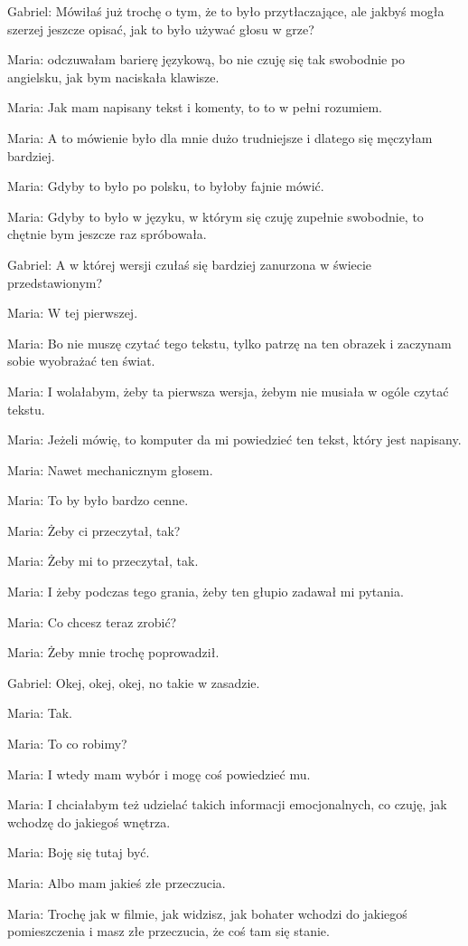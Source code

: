 Gabriel: Mówiłaś już trochę o tym, że to było przytłaczające, ale jakbyś mogła szerzej jeszcze opisać, jak to było używać głosu w grze?

Maria: odczuwałam barierę językową, bo nie czuję się tak swobodnie po angielsku, jak bym naciskała klawisze.

Maria: Jak mam napisany tekst i komenty, to to w pełni rozumiem.

Maria: A to mówienie było dla mnie dużo trudniejsze i dlatego się męczyłam bardziej.

Maria: Gdyby to było po polsku, to byłoby fajnie mówić.

Maria: Gdyby to było w języku, w którym się czuję zupełnie swobodnie, to chętnie bym jeszcze raz spróbowała.

Gabriel: A w której wersji czułaś się bardziej zanurzona w świecie przedstawionym?

Maria: W tej pierwszej.

Maria: Bo nie muszę czytać tego tekstu, tylko patrzę na ten obrazek i zaczynam sobie wyobrażać ten świat.

Maria: I wolałabym, żeby ta pierwsza wersja, żebym nie musiała w ogóle czytać tekstu.

Maria: Jeżeli mówię, to komputer da mi powiedzieć ten tekst, który jest napisany.

Maria: Nawet mechanicznym głosem.

Maria: To by było bardzo cenne.

Maria: Żeby ci przeczytał, tak?

Maria: Żeby mi to przeczytał, tak.

Maria: I żeby podczas tego grania, żeby ten głupio zadawał mi pytania.

Maria: Co chcesz teraz zrobić?

Maria: Żeby mnie trochę poprowadził.

Gabriel: Okej, okej, okej, no takie w zasadzie.

Maria: Tak.

Maria: To co robimy?

Maria: I wtedy mam wybór i mogę coś powiedzieć mu.

Maria: I chciałabym też udzielać takich informacji emocjonalnych, co czuję, jak wchodzę do jakiegoś wnętrza.

Maria: Boję się tutaj być.

Maria: Albo mam jakieś złe przeczucia.

Maria: Trochę jak w filmie, jak widzisz, jak bohater wchodzi do jakiegoś pomieszczenia i masz złe przeczucia, że coś tam się stanie.

